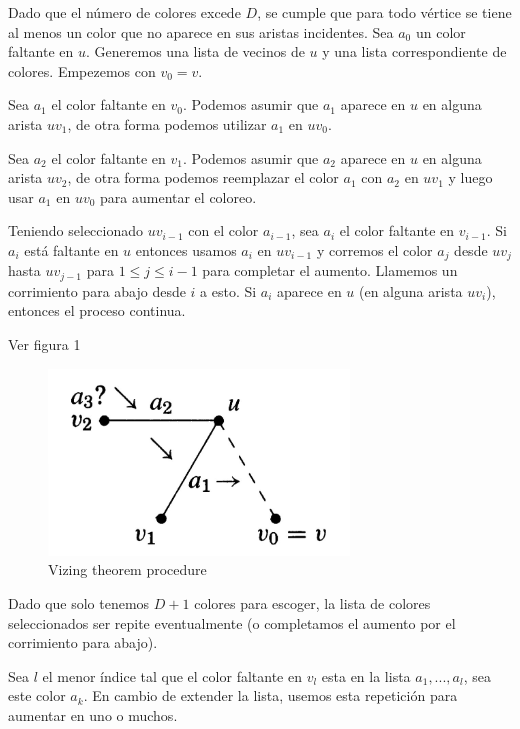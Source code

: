 \documentclass[a4paper]{article}
\begin{document}
 Dado que el n\'umero de colores excede $D$, se cumple que para todo v\'ertice se tiene al menos un color que no aparece en sus aristas incidentes. Sea $a_0$ un color faltante en $u$. Generemos una lista de vecinos de $u$ y una lista correspondiente de colores. Empezemos con $v_0 = v$.
 
 Sea $a_1$ el color faltante en $v_0$. Podemos asumir que $a_1$ aparece en $u$ en alguna arista $uv_1$, de otra forma podemos utilizar $a_1$ en $uv_0$.
 
 Sea $a_2$ el color faltante en $v_1$. Podemos asumir que $a_2$ aparece en $u$ en alguna arista $uv_2$, de otra forma podemos reemplazar el color $a_1$ con $a_2$ en $uv_1$ y luego usar $a_1$ en $uv_0$ para aumentar el coloreo. 
 
 Teniendo seleccionado $uv_{i-1}$ con el color $a_{i-1}$, sea $a_i$ el color faltante en $v_{i-1}$. Si $a_i$ est\'a faltante en $u$ entonces usamos $a_i$ en $uv_{i-1}$ y corremos el color $a_j$ desde $uv_j$ hasta $uv_{j-1}$ para $1 \leq j \leq i-1$ para completar el aumento. Llamemos un corrimiento para abajo desde $i$ a esto. Si $a_i$ aparece en $u$ (en alguna arista $uv_i$), entonces el proceso continua.

 Ver figura 1
 
\begin{figure}
    \begin{center}
        \includegraphics[width=8cm]{image1.png}
        \caption{Vizing theorem procedure} 
    \end{center}
\end{figure}

Dado que solo tenemos $D + 1$ colores para escoger, la lista de colores seleccionados ser repite eventualmente (o completamos el aumento por el corrimiento para abajo).

Sea $l$ el menor \'indice tal que el color faltante en $v_l$ esta en la lista $a_1, ..., a_l$, sea este color $a_k$. En cambio de extender la lista, usemos esta repetici\'on para aumentar en uno o muchos.
\end{document}
